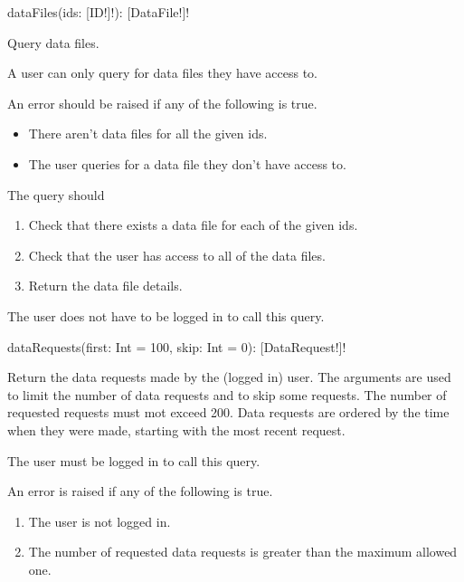 \begin{code}
dataFiles(ids: [ID!]!): [DataFile!]!
\end{code}

Query data files.

\restrictions

A user can only query for data files they have access to.

\errors

An error should be raised if any of the following is true.

\begin{itemize}
    \item There aren't data files for all the given ids.
    \item The user queries for a data file they don't have access to.
\end{itemize}

\functionality

The query should

\begin{enumerate}
    \item Check that there exists a data file for each of the given ids.
    \item Check that the user has access to all of the data files.
    \item Return the data file details.
\end{enumerate}

\begin{note}
The user does not have to be logged in to call this query.
\end{note}


\begin{code}
dataRequests(first: Int = 100, skip: Int = 0): [DataRequest!]!
\end{code}

Return the data requests made by the (logged in) user. The arguments are used to limit the number of data requests and to skip some requests. The number of requested requests must mot exceed 200. Data requests are ordered by the time when they were made, starting with the most recent request.

\restrictions

The user must be logged in to call this query.

\errors

An error is raised if any of the following is true.

\begin{enumerate}
    \item The user is not logged in.
    \item The number of requested data requests is greater than the maximum allowed one.
\end{enumerate}

